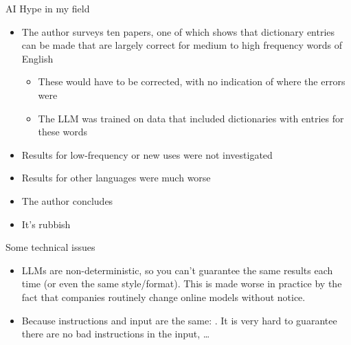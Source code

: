 \begin{frame}{AI Hype in my field}


\begin{itemize}
\item The author surveys ten papers, one of which shows that dictionary entries can be made that are largely correct for medium to high frequency words of English \citep{10.1093/ijl/ecad021}
  \begin{itemize}
  \item These would have to be corrected, with no indication of where the errors were
  \item The LLM was trained on data that included dictionaries with entries for these words
  \end{itemize}
\item Results for low-frequency or new uses were not investigated
\item Results for other languages were much worse
\item The author concludes 
\item It's rubbish
\end{itemize}


\end{frame}

\begin{frame}{Some technical issues}
\begin{itemize}
\item LLMs are non-deterministic, so you can't guarantee the same results each time (or even the same style/format).   This is made worse in practice by the fact that companies routinely change online models without notice.
\item Because instructions and input are the same: .   It is very hard to guarantee there are no bad instructions in the input, \ldots
\end{itemize}
\end{frame}

